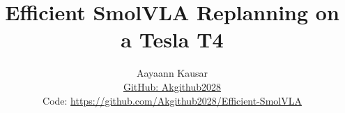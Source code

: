 \documentclass[10pt,twocolumn,letterpaper]{article}
\title{Efficient SmolVLA Replanning on a Tesla T4}
\author{Aayaann Kausar\\
{\small \href{https://github.com/Akgithub2028}{GitHub: Akgithub2028}}\\
{\small Code: \url{https://github.com/Akgithub2028/Efficient-SmolVLA}}}
\begin{document}
\maketitle







{
    \footnotesize
    
    
}
\end{document}
